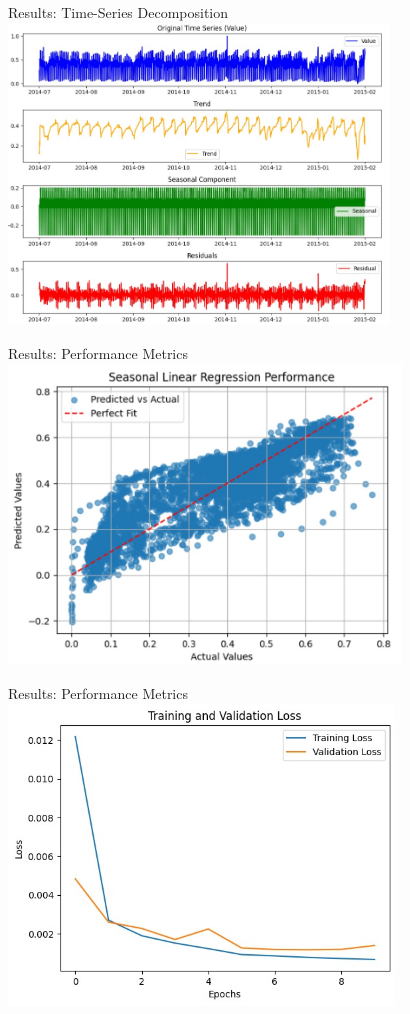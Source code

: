 \documentclass[10pt]{beamer}
\begin{document}
\begin{frame}{Results: Time-Series Decomposition}
    \centering
    \includegraphics[height=8cm]{Preprocessing}
\end{frame}

\begin{frame}{Results: Performance Metrics}
    \centering
    \includegraphics[height=8cm]{SLR_Performance}
\end{frame}

\begin{frame}{Results: Performance Metrics}
    \centering
    \includegraphics[height=8cm]{Training_Validation_Lost}
\end{frame}
\end{document}
